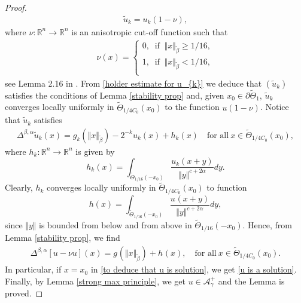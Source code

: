 \documentclass[10pt, leqno]{article}
\theoremstyle{definition}
\theoremstyle{remark}
\numberwithin{equation}{section}
\begin{document}
\begin{proof}
\begin{eqnarray}
\tilde{u}_{k} = u_{k}(1 - \nu),
\end{eqnarray}
where $\nu: \mathbb{R}^{n} \rightarrow \mathbb{R}^{n}$ is an anisotropic cut-off function such that
\begin{eqnarray}
\nu(x)= \left \{
\begin{array}{ll}
0, \ \text{ if } \ \Vert x \Vert_{\tilde{\beta}} \geq 1/16, \\
1, \ \text{ if } \ \Vert x \Vert_{\tilde{\beta}} < 1/16, \\
\end{array}
\right.
\end{eqnarray}
see Lemma 2.16 in \cite{LEITAO LP}. From \eqref{holder estimate for u_{k}} we deduce that $(\tilde{u}_{k})$ satisfies the conditions of Lemma \ref{stability prop} and, given $x_{0} \in \partial \tilde{\Theta}_{1}$, $\tilde{u}_{k}$ converges locally uniformly in $\tilde{\Theta}_{1/4C_{0}}(x_{0})$ to the function $u(1 -\nu)$. Notice that $\tilde{u}_{k}$ satisfies
\begin{eqnarray}
\Delta^{\beta, \alpha}\tilde{u}_{k}(x) = g_{k}\left(\Vert x \Vert^{}_{\tilde{\beta}}\right) - 2^{-k}u_{k}(x) + h_{k}(x) \quad \text{for all} \ x \in \tilde{\Theta}_{1/4C_{0}}(x_{0}),
\end{eqnarray}
where $h_{k}: \mathbb{R}^{n} \rightarrow \mathbb{R}^{n}$ is given by
$$
h_{k}(x) = \displaystyle\int_{\tilde{\Theta}_{1/16}(-x_{0})} \dfrac{u_{k}(x+y)}{\Vert y \Vert^{c+2\alpha}}dy.
$$
Clearly, $h_{k}$ converges locally uniformly in $\tilde{\Theta}_{1/4C_{0}}(x_{0})$ to function
$$
h(x) = \displaystyle\int_{\tilde{\Theta}_{1/16}(-x_{0})} \dfrac{u_{}(x+y)}{\Vert y \Vert^{c+2\alpha}}dy,
$$
since $\Vert y \Vert$ is bounded from below and from above in $\tilde{\Theta}_{1/16}(-x_{0})$. Hence, from Lemma \ref{stability prop}, we find
\begin{eqnarray}
\label{to deduce that u is solution}
\Delta^{\beta, \alpha}\left[ u - \nu u \right](x) =  g_{}\left(\Vert x \Vert^{}_{\tilde{\beta}}\right)  + h_{}(x), \quad \text{for all} \ x \in \tilde{\Theta}_{1/4C_{0}}(x_{0}).
\end{eqnarray}
In particular, if $x=x_{0}$ in \eqref{to deduce that u is solution}, we get \eqref{u is a solution}. Finally, by Lemma \ref{strong max principle}, we get $u \in \mathcal{A}^{+}_{\gamma}$ and the Lemma is proved.
\end{proof}
\end{document}
